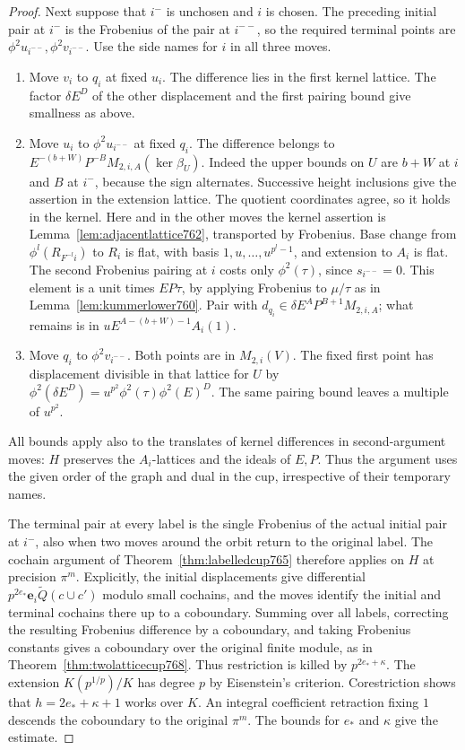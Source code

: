\documentclass[a4paper,11pt]{article}
\theoremstyle{definition}
\theoremstyle{remark}
\numberwithin{equation}{section}
\begin{document}
\begin{proof}
Next suppose that \(i^-\) is unchosen and \(i\) is chosen.
The preceding initial pair at \(i^-\) is the Frobenius
of the pair at \(i^{--}\), so the required terminal
points are \(\phi^2 u_{i^{--}},\phi^2 v_{i^{--}}\).
Use the side names for \(i\) in all three moves.
\begin{enumerate}
\item Move \(v_i\) to \(q_i\) at fixed \(u_i\). The
difference lies in the first kernel lattice. The factor
\(\delta E^D\) of the other displacement and the first
pairing bound give smallness as above.
\item Move \(u_i\) to \(\phi^2 u_{i^{--}}\) at fixed
\(q_i\). The difference belongs to
\(E^{-(b+W)}P^{-B}M_{2,i,A}(\ker\beta_U)\). Indeed the
upper bounds on \(U\) are \(b+W\) at \(i\) and \(B\) at
\(i^-\), because the sign alternates. Successive height
inclusions give the assertion in the extension lattice.
The quotient coordinates agree, so it holds in the
kernel. Here and in the other moves the kernel assertion
is Lemma~\ref{lem:adjacentlattice762}, transported by
Frobenius. Base change from \(\phi^l(R_{F^{-l}i})\)
to \(R_i\) is flat, with basis \(1,u,\ldots,u^{p^l-1}\),
and extension to \(A_i\) is flat.
The second Frobenius pairing at \(i\) costs only
\(\phi^2(\tau)\), since \(s_{i^{--}}=0\).
This element is a unit times \(EP\tau\), by applying
Frobenius to \(\mu/\tau\) as in
Lemma~\ref{lem:kummerlower760}. Pair with
\(d_{q_i}\in\delta E^A P^{B+1}M_{2,i,A}\); what remains
is in \(u E^{A-(b+W)-1}A_i(1)\).
\item Move \(q_i\) to \(\phi^2 v_{i^{--}}\). Both points
are in \(M_{2,i}(V)\). The fixed first point has
displacement divisible in that lattice for \(U\) by
\(\phi^2(\delta E^D)=u^{p^2}\phi^2(\tau)\phi^2(E)^D\).
The same pairing bound leaves a multiple of \(u^{p^2}\).
\end{enumerate}
All bounds apply also to the translates of kernel
differences in second-argument moves: \(H\) preserves
the \(A_i\)-lattices and the ideals of \(E,P\). Thus the
argument uses the given order of the graph and dual in
the cup, irrespective of their temporary names.

The terminal pair at every label is the single Frobenius
of the actual initial pair at \(i^-\), also when two
moves around the orbit return to the original label.
The cochain argument of Theorem~\ref{thm:labelledcup765}
therefore applies on \(H\) at precision \(\pi^m\).
Explicitly, the initial displacements give differential
\(p^{2e_*}\mathbf e_i\widetilde Q(c\cup c')\) modulo small
cochains, and the moves identify the initial and terminal
cochains there up to a coboundary. Summing over all
labels, correcting the resulting Frobenius difference
by a coboundary, and taking Frobenius constants gives a
coboundary over the original finite module, as in
Theorem~\ref{thm:twolatticecup768}. Thus restriction is
killed by \(p^{2e_*+\kappa}\). The extension
\(K(p^{1/p})/K\) has degree \(p\) by Eisenstein's
criterion. Corestriction shows that \(h=2e_*+\kappa+1\)
works over \(K\). An integral coefficient retraction fixing
\(1\) descends the coboundary to the original \(\pi^m\).
The bounds for \(e_*\) and \(\kappa\) give the estimate.
\end{proof}
\clearpage
\end{document}
